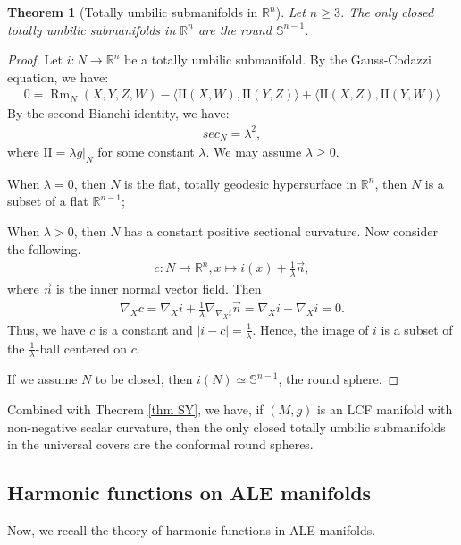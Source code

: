 \documentclass[12pt]{amsart}
\newtheorem{theorem}{Theorem}[section]
\theoremstyle{definition}
\begin{document}
\begin{theorem}[Totally umbilic submanifolds in $\mathbb{R}^n$]\label{tus in Rn}
Let $n\geq 3$. The only closed totally umbilic submanifolds in $\mathbb{R}^n$ are the round $\mathbb{S}^{n-1}$.     
\end{theorem}
\begin{proof}
    Let $i: N\to \mathbb{R}^n$ be a totally umbilic submanifold. By the Gauss-Codazzi equation, we have:
    \begin{align*}
        0 = \operatorname{Rm}_N(X,Y,Z,W) - \langle \text{II}(X,W), \text{II}(Y,Z)\rangle + \langle \text{II}(X,Z), \text{II}(Y,W)\rangle
    \end{align*}
    By the second Bianchi identity, we have:
    \begin{align*}
        sec_N = \lambda^2,
    \end{align*}
    where $\text{II} = \lambda g|_N$ for some constant $\lambda$. We may assume $\lambda\geq 0$.

    When $\lambda = 0$, then $N$ is the flat, totally geodesic hypersurface in $\mathbb{R}^n$, then $N$ is a subset of a flat $\mathbb{R}^{n-1}$;

    When $\lambda > 0$, then $N$ has a constant positive sectional curvature. Now consider the following.
    \begin{align*}
        c: N\to \mathbb{R}^n, x\mapsto i(x) + \frac{1}{\lambda}\vec{n},
    \end{align*}
    where $\vec{n}$ is the inner normal vector field. Then
    \begin{align*}
       \nabla_X c = \nabla_X i + \frac{1}{\lambda}\nabla_{\nabla_X i} \vec{n}  = \nabla_X i - \nabla_X i = 0 .
    \end{align*}
    Thus, we have $c$ is a constant and $|i - c| = \frac{1}{\lambda}$. Hence, the image of $i$ is a subset of the $\frac{1}{\lambda}$-ball centered on $c$. 

    If we assume $N$ to be closed, then $i(N)\simeq \mathbb{S}^{n-1}$, the round sphere.
\end{proof}

Combined with Theorem \ref{thm SY}, we have, if $(M,g)$ is an LCF manifold with non-negative scalar curvature, then the only closed totally umbilic submanifolds in the universal covers are the conformal round spheres.


\subsection{Harmonic functions on ALE manifolds}
Now, we recall the theory of harmonic functions in ALE manifolds.
\end{document}

